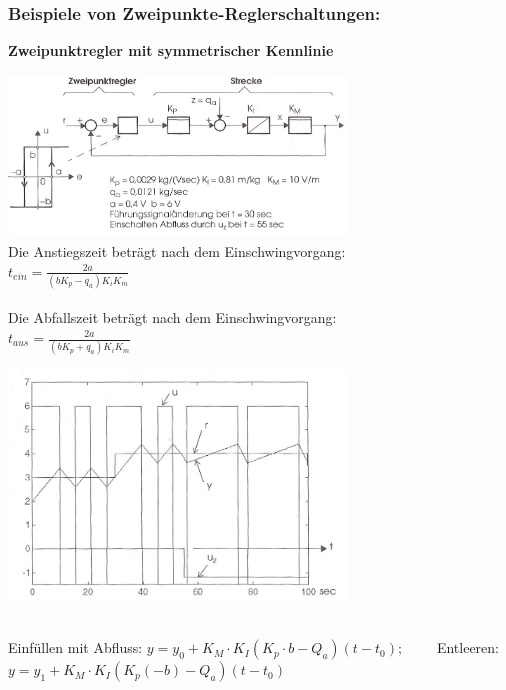 	\subsubsection{Beispiele von Zweipunkte-Reglerschaltungen:}
		\textbf{Zweipunktregler mit symmetrischer Kennlinie } \\
		\begin{minipage}{9cm}
			\vspace{.5cm}        
	 		\includegraphics[width=9cm]{./bilder/Zweipunktregler-b+b2.jpg}\\
			Die Anstiegszeit beträgt nach dem Einschwingvorgang:\\
			$t_{ein}=\frac{2a}{(b K_p - q_a)K_i K_m}$ \\ \\
			Die Abfallszeit beträgt nach dem Einschwingvorgang:\\
			$t_{aus}=\frac{2a}{(b K_p + q_a)K_i K_m}$
        \end{minipage}
		\begin{minipage}{9cm}
			\vspace{.5cm}        
			\includegraphics[width=9cm]{./bilder/Zweipunktregler-b+b_dia.jpg}
        \end{minipage}\\
         Einfüllen mit Abfluss: $y = y_0 + K_M \cdot K_I(K_p \cdot b - Q_a)(t-t_0); \qquad$ 
         Entleeren: $y=y_1 + K_M \cdot K_I(K_p(-b) - Q_a)(t-t_0)$
    
